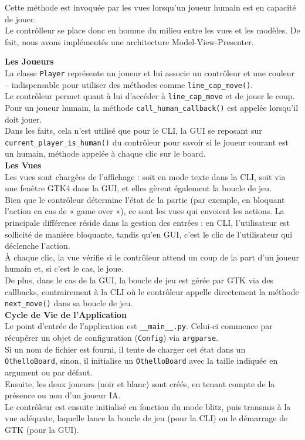 \documentclass[a4paper,12pt]{article}
\begin{document}
Cette méthode est invoquée par les vues lorsqu’un joueur humain est en capacité
de jouer.\\

Le contrôlleur se place donc en homme du milieu entre les vues et les modèles.
De fait, nous avons implémentés une architecture Model-View-Presenter.

\textbf{Les Joueurs}\\

La classe \texttt{Player} représente un joueur et lui associe un contrôleur et
une couleur – indispensable pour utiliser des méthodes comme
\texttt{line\_cap\_move()}.\\ Le contrôleur permet quant à lui d’accéder à
\texttt{line\_cap\_move} et de jouer le coup. Pour un joueur humain, la méthode
\texttt{call\_human\_callback()} est appelée lorsqu’il doit jouer.\\ Dans les
faits, cela n’est utilisé que pour le CLI, la GUI se reposant sur
\texttt{current\_player\_is\_human()} du contrôleur pour savoir si le joueur
courant est un humain, méthode appelée à chaque clic sur le board.\\

\textbf{Les Vues}\\

Les vues sont chargées de l’affichage : soit en mode texte dans la CLI, soit
via une fenêtre GTK4 dans la GUI, et elles gèrent également la boucle de jeu.
\\ Bien que le contrôleur détermine l’état de la partie (par exemple, en
bloquant l’action en cas de « game over »), ce sont les vues qui envoient les
actions. La principale différence réside dans la gestion des entrées : en CLI,
l’utilisateur est sollicité de manière bloquante, tandis qu’en GUI, c’est le
clic de l’utilisateur qui déclenche l’action.\\ À chaque clic, la vue vérifie
si le contrôleur attend un coup de la part d’un joueur humain et, si c’est le
cas, le joue. \\ De plus, dans le cas de la GUI, la boucle de jeu est gérée par
GTK via des callbacks, contrairement à la CLI où le contrôleur appelle
directement la méthode \texttt{next\_move()} dans sa boucle de jeu.\\

\textbf{Cycle de Vie de l’Application}\\

Le point d’entrée de l’application est \texttt{\_\_main\_\_.py}. Celui-ci
commence par récupérer un objet de configuration (\texttt{Config}) via
\texttt{argparse}.\\ Si un nom de fichier est fourni, il tente de charger cet
état dans un \texttt{OthelloBoard}, sinon, il initialise un
\texttt{OthelloBoard} avec la taille indiquée en argument ou par défaut.\\
Ensuite, les deux joueurs (noir et blanc) sont créés, en tenant compte de la
présence ou non d’un joueur IA.\\ Le contrôleur est ensuite initialisé en
fonction du mode blitz, puis transmis à la vue adéquate, laquelle lance la
boucle de jeu (pour la CLI) ou le démarrage de GTK (pour la GUI).\\
\end{document}
